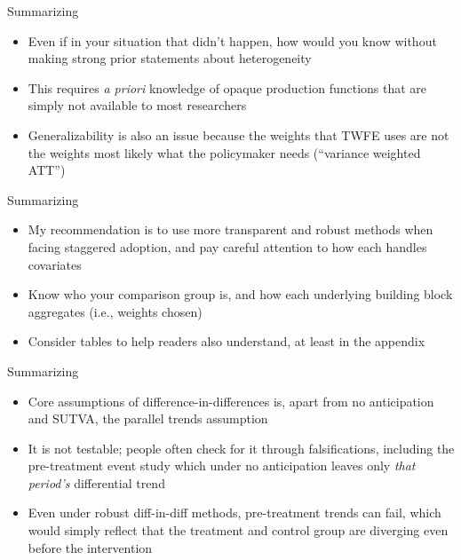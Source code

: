 \documentclass{beamer}
\begin{document}
\begin{frame}{Summarizing}

\begin{itemize}
\item Even if in your situation that didn't happen, how would you know without making strong prior statements about heterogeneity
\item This requires \emph{a priori} knowledge of opaque production functions that are simply not available to most researchers
\item Generalizability is also an issue because the weights that TWFE uses are not the weights most likely what the policymaker needs (``variance weighted ATT'')

\end{itemize}

\end{frame}

\begin{frame}{Summarizing}

\begin{itemize}

\item My recommendation is to use more transparent and robust methods when facing staggered adoption, and pay careful attention to how each handles covariates
\item Know who your comparison group is, and how each underlying building block aggregates (i.e., weights chosen)
\item Consider tables to help readers also understand, at least in the appendix

\end{itemize}

\end{frame}

\begin{frame}{Summarizing}

\begin{itemize}

\item Core assumptions of difference-in-differences is, apart from no anticipation and SUTVA, the parallel trends assumption
\item It is not testable; people often check for it through falsifications, including the pre-treatment event study which under no anticipation leaves only \emph{that period's} differential trend
\item Even under robust diff-in-diff methods, pre-treatment trends can fail, which would simply reflect that the treatment and control group are diverging even before the intervention

\end{itemize}

\end{frame}
\end{document}
